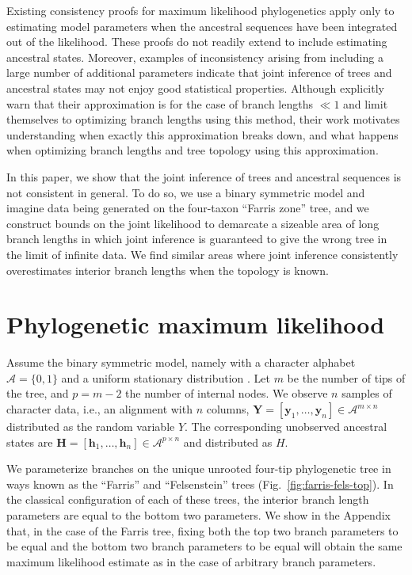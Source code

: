 \documentclass{article}
\newcommand{\alphabet}{\mathcal{A}}
\newcommand{\fullAlignment}{\mathbf{Y}}
\newcommand{\alignmentColumn}{\mathbf{y}}
\newcommand{\alignmentColumnRV}{Y}
\newcommand{\fullAncestralStates}{\mathbf{H}}
\newcommand{\ancestralStateColumn}{\mathbf{h}}
\newcommand{\ancestralStateColumnRV}{H}
\newcommand{\nCols}{n}
\newcommand{\nSiteRows}{m}
\newcommand{\nAncestralStateRows}{p}
\begin{document}
Existing consistency proofs for maximum likelihood phylogenetics \cite{RoyChoudhury2015-ta} apply only to estimating model parameters when the ancestral sequences have been integrated out of the likelihood.
These proofs do not readily extend to include estimating ancestral states.
Moreover, examples of inconsistency arising from including a large number of additional parameters \cite{Neyman1948-tt} indicate that joint inference of trees and ancestral states may not enjoy good statistical properties.
Although \cite{Sagulenko2017-jo} explicitly warn that their approximation is for the case of branch lengths $\ll 1$ and limit themselves to optimizing branch lengths using this method, their work motivates understanding when exactly this approximation breaks down, and what happens when optimizing branch lengths and tree topology using this approximation.

In this paper, we show that the joint inference of trees and ancestral sequences is not consistent in general.
To do so, we use a binary symmetric model and imagine data being generated on the four-taxon ``Farris zone'' \cite{Siddall1998-hq} tree, and we construct bounds on the joint likelihood to demarcate a sizeable area of long branch lengths in which joint inference is guaranteed to give the wrong tree in the limit of infinite data.
We find similar areas where joint inference consistently overestimates interior branch lengths when the topology is known.

\section*{Phylogenetic maximum likelihood}

Assume the binary symmetric model, namely with a character alphabet $\alphabet=\{0,1\}$ and a uniform stationary distribution \cite{Semple2003-em}.
Let $\nSiteRows$ be the number of tips of the tree, and $\nAncestralStateRows = \nSiteRows-2$ the number of internal nodes.
We observe $\nCols$ samples of character data, i.e., an alignment with $\nCols$ columns, $\fullAlignment=[\alignmentColumn_1,\ldots,\alignmentColumn_\nCols]\in\alphabet^{\nSiteRows\times\nCols}$ distributed as the random variable $\alignmentColumnRV$.
The corresponding unobserved ancestral states are $\fullAncestralStates=[\ancestralStateColumn_1,\ldots,\ancestralStateColumn_\nCols]\in\alphabet^{\nAncestralStateRows\times\nCols}$ and distributed as $\ancestralStateColumnRV$.

We parameterize branches on the unique unrooted four-tip phylogenetic tree in ways known as the ``Farris'' and ``Felsenstein'' trees (Fig.~\ref{fig:farris-fels-top}).
In the classical configuration of each of these trees, the interior branch length parameters are equal to the bottom two parameters.
We show in the Appendix that, in the case of the Farris tree, fixing both the top two branch parameters to be equal and the bottom two branch parameters to be equal will obtain the same maximum likelihood estimate as in the case of arbitrary branch parameters.
\end{document}

